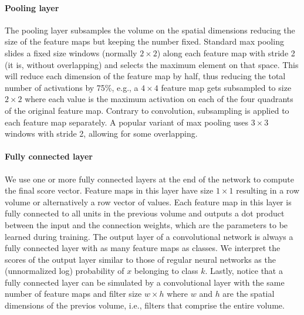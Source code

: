 \paragraph{Pooling layer} The pooling layer subsamples the volume on the spatial dimensions reducing the size of the feature maps but keeping the number fixed. Standard max pooling slides a fixed size windows (normally $2\times2$) along each feature map with stride 2 (it is, without overlapping) and selects the maximum element on that space. This will reduce each dimension of the feature map by half, thus reducing the total number of activations by 75\%, e.g., a $4\times4$ feature map gets subsampled to size $2\times 2$ where each value is the maximum activation on each of the four quadrants of the original feature map. Contrary to convolution, subsampling is applied to each feature map separately. A popular variant of max pooling uses $3\times 3$ windows with stride 2, allowing for some overlapping.

\paragraph{Fully connected layer} We use one or more fully connected layers at the end of the network to compute the final score vector. Feature maps in this layer have size $1 \times 1$ resulting in a row volume or alternatively a row vector of values. Each feature map in this layer is fully connected to all units in the previous volume and outputs a dot product between the input and the connection weights, which are the parameters to be learned during training. The output layer of a convolutional network is always a fully connected layer with as many feature maps as classes. We interpret the scores of the output layer similar to those of regular neural networks as the (unnormalized log) probability of $x$ belonging to class $k$. Lastly, notice that a fully connected layer can be simulated by a convolutional layer with the same number of feature maps and filter size $w\times h$ where $w$ and $h$ are the spatial dimensions of the previos volume, i.e., filters that comprise the entire volume.

